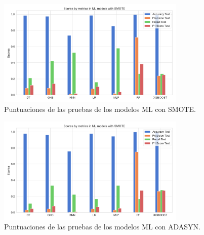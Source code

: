 \begin{figure}[h!]
	\centering
	\includegraphics[width=0.8\textwidth]{"figuras/Experimento2/ML_SMOTE_test"}
	\caption{Puntuaciones de las pruebas de los modelos ML con SMOTE.}
	\label{an:4}
\end{figure}

\begin{figure}[h!]
	\centering
	\includegraphics[width=0.8\textwidth]{"figuras/Experimento2/ML_ADASYN_test"}
	\caption{Puntuaciones de las pruebas de los modelos ML con ADASYN.}
	\label{an:5}
\end{figure}

